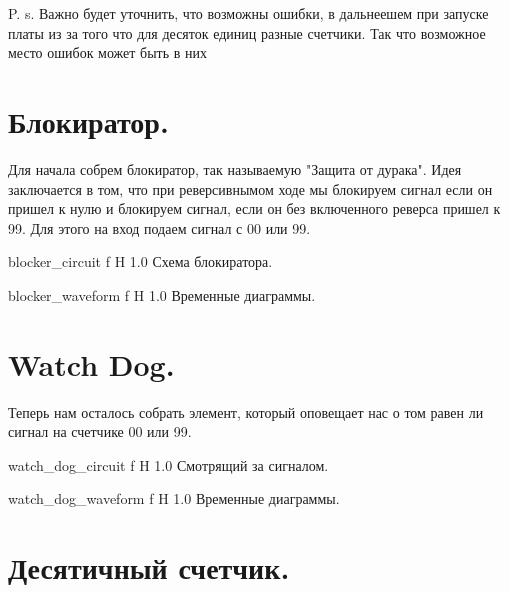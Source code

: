 \documentclass{bmstu}
\begin{document}
	\begin{flushleft}
		P. s. Важно будет уточнить, что возможны ошибки,
		в дальнеешем при запуске платы
		из за того что для десяток единиц разные счетчики. 
		Так что возможное место ошибок может быть в них
	\end{flushleft}

	\section{Блокиратор.}

	\begin{flushleft}
		Для начала собрем блокиратор, так называемую "Защита от дурака". 
		Идея заключается в том, что при реверсивнымом ходе мы блокируем
		сигнал если он пришел к нулю и блокируем сигнал, если он без 
		включенного реверса пришел к 99. Для этого на вход подаем
		сигнал с 00 или 99.
	\end{flushleft}

	{blocker_circuit}
	{f} %
	{H} %
	{1.0\textwidth} %
	{Схема блокиратора.} %
	
	{blocker_waveform}
	{f} %
	{H} %
	{1.0\textwidth} %
	{Временные диаграммы.} %

	\section{Watch Dog.}

	\begin{flushleft}
		Теперь нам осталось собрать элемент, который оповещает нас
		о том равен ли сигнал на счетчике 00 или 99.
	\end{flushleft}

	{watch_dog_circuit}
	{f} %
	{H} %
	{1.0\textwidth} %
	{Смотрящий за сигналом.} %
	
	{watch_dog_waveform}
	{f} %
	{H} %
	{1.0\textwidth} %
	{Временные диаграммы.} %

	\section{Десятичный счетчик.}
\end{document}
